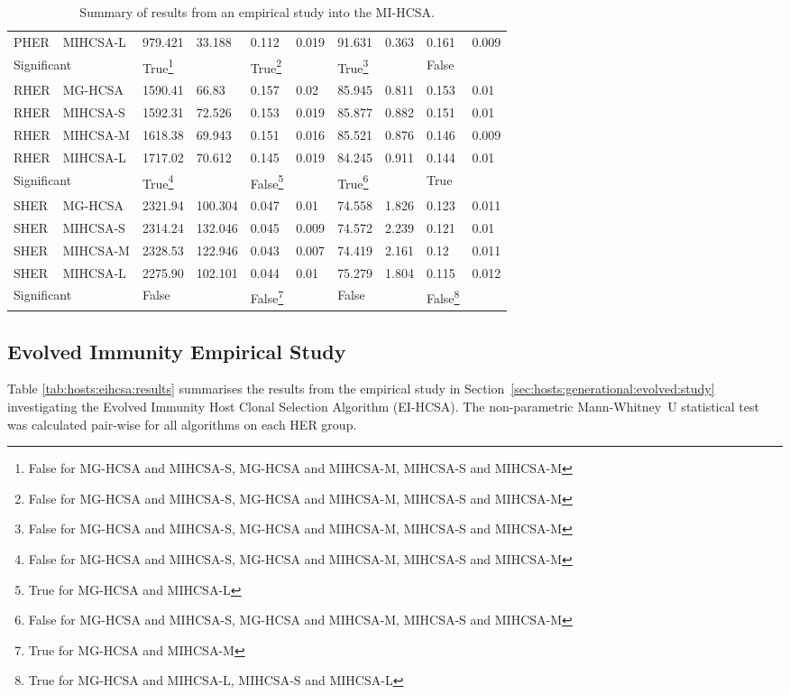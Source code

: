 \begin{table}[H]
\begin{minipage}{\textwidth}
\begin{tabular}{llllllllll}
		PHER & MIHCSA-L & 979.421 & 33.188 & 0.112 & 0.019 & 91.631 & 0.363 & 0.161 & 0.009 \\ 
		\multicolumn{2}{l}{Significant} & True\footnote{False for MG-HCSA and MIHCSA-S, MG-HCSA and MIHCSA-M, MIHCSA-S and MIHCSA-M} &  & True\footnote{False for MG-HCSA and MIHCSA-S, MG-HCSA and MIHCSA-M, MIHCSA-S and MIHCSA-M} & & True\footnote{False for MG-HCSA and MIHCSA-S, MG-HCSA and MIHCSA-M, MIHCSA-S and MIHCSA-M} & & False & \\ 
		\midrule
		RHER & MG-HCSA & 1590.41 & 66.83 & 0.157 & 0.02 & 85.945 & 0.811 & 0.153 & 0.01 \\ 
		RHER & MIHCSA-S & 1592.31 & 72.526 & 0.153 & 0.019 & 85.877 & 0.882 & 0.151 & 0.01 \\ 
		RHER & MIHCSA-M & 1618.38 & 69.943 & 0.151 & 0.016 & 85.521 & 0.876 & 0.146 & 0.009 \\ 
		RHER & MIHCSA-L & 1717.02 & 70.612 & 0.145 & 0.019 & 84.245 & 0.911 & 0.144 & 0.01 \\ 
		\multicolumn{2}{l}{Significant} & True\footnote{False for MG-HCSA and MIHCSA-S, MG-HCSA and MIHCSA-M, MIHCSA-S and MIHCSA-M} & & False\footnote{True for MG-HCSA and MIHCSA-L} & & True\footnote{False for MG-HCSA and MIHCSA-S, MG-HCSA and MIHCSA-M, MIHCSA-S and MIHCSA-M} & & True & \\ 
		\midrule
		SHER & MG-HCSA & 2321.94 & 100.304 & 0.047 & 0.01 & 74.558 & 1.826 & 0.123 & 0.011 \\ 
		SHER & MIHCSA-S & 2314.24 & 132.046 & 0.045 & 0.009 & 74.572 & 2.239 & 0.121 & 0.01 \\ 
		SHER & MIHCSA-M & 2328.53 & 122.946 & 0.043 & 0.007 & 74.419 & 2.161 & 0.12 & 0.011 \\ 
		SHER & MIHCSA-L & 2275.90 & 102.101 & 0.044 & 0.01 & 75.279 & 1.804 & 0.115 & 0.012 \\ 
		\multicolumn{2}{l}{Significant} & False & & False\footnote{True for MG-HCSA and MIHCSA-M} & & False & & False\footnote{True for MG-HCSA and MIHCSA-L, MIHCSA-S and MIHCSA-L} & \\ 
		\bottomrule
		\end{tabular}		
		\end{minipage}
	\caption{Summary of results from an empirical study into the MI-HCSA.}
	\label{tab:hosts:mihcsa:results}
\end{table}

%
%
\subsection{Evolved Immunity Empirical Study}
\label{appendix:results:hosts:evolved}
Table \ref{tab:hosts:eihcsa:results} summarises the results from the empirical study in Section~\ref{sec:hosts:generational:evolved:study} investigating the Evolved Immunity Host Clonal Selection Algorithm (EI-HCSA). The non-parametric Mann-Whitney~U statistical test was calculated pair-wise for all algorithms on each HER group.


